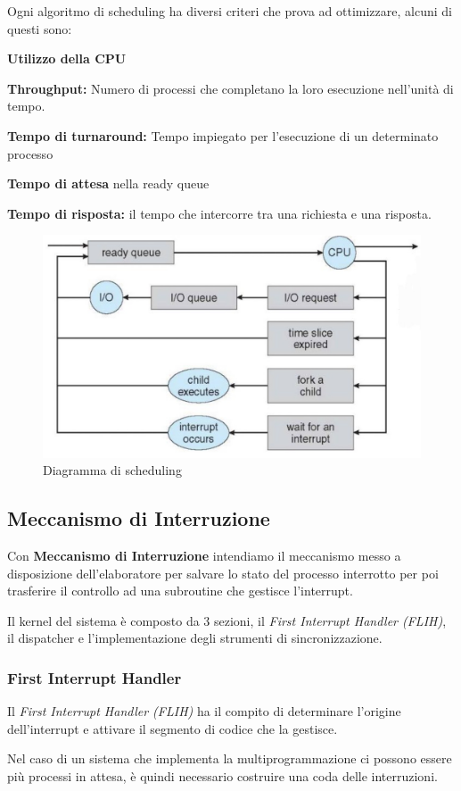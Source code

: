 Ogni algoritmo di scheduling ha diversi criteri che prova ad ottimizzare, alcuni di questi sono:
\begin{sitemize}
    \item \textbf{Utilizzo della CPU}
    \item \textbf{Throughput:} Numero di processi che completano la loro esecuzione nell'unità di tempo.
    \item \textbf{Tempo di turnaround:} Tempo impiegato per l'esecuzione di un determinato processo
    \item \textbf{Tempo di attesa} nella ready queue
    \item \textbf{Tempo di risposta:} il tempo che intercorre tra una richiesta e una risposta.
\end{sitemize}

\begin{figure}[H]
    \centering
    \includegraphics[width=0.5\linewidth]{assets/scheduler.jpg}
    \caption{Diagramma di scheduling}
\end{figure}

\subsection{Meccanismo di Interruzione}
Con \textbf{Meccanismo di Interruzione} intendiamo il meccanismo messo a disposizione dell'elaboratore per salvare lo stato del processo interrotto per poi trasferire il controllo ad una subroutine che gestisce l'interrupt.

\spacer
Il kernel del sistema è composto da 3 sezioni, il \textit{First Interrupt Handler (FLIH)}, il dispatcher e l'implementazione degli strumenti di sincronizzazione.

\subsubsection{First Interrupt Handler}
Il \textit{First Interrupt Handler (FLIH)} ha il compito di determinare l'origine dell'interrupt e attivare il segmento di codice che la gestisce.

\spacer
Nel caso di un sistema che implementa la multiprogrammazione ci possono essere più processi in attesa, è quindi necessario costruire una coda delle interruzioni.

